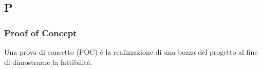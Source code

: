 \subsection{P}

\subsubsection{Proof of Concept}
Una prova di concetto (POC\g) è la realizzazione di una bozza del progetto al fine di dimostrarne la fattibilità.